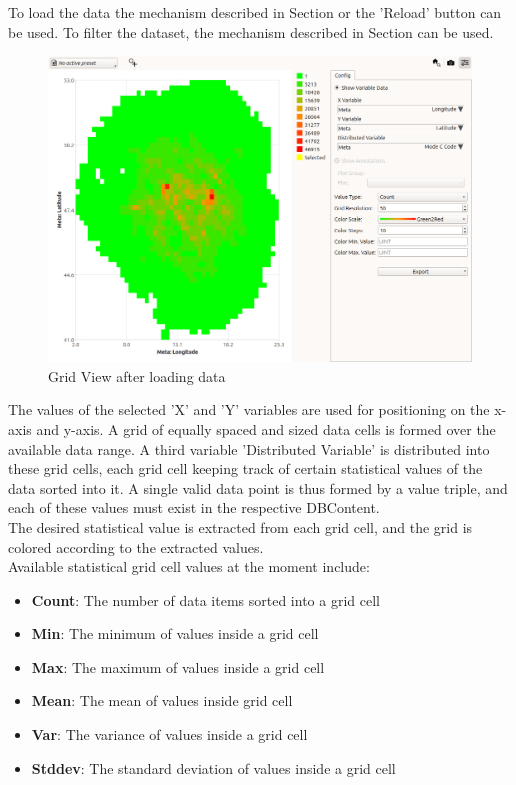 To load the data the mechanism described in Section  or the 'Reload' button can be used. To filter the dataset, the mechanism described in Section  can be used. \\

\begin{figure}[H]
    \hspace*{-2cm}
    \includegraphics[width=18cm,frame]{figures/grid_loaded.png}
  \caption{Grid View after loading data}
\end{figure}

The values of the selected 'X' and 'Y' variables are used for positioning on the x-axis and y-axis.
A grid of equally spaced and sized data cells is formed over the available data range.
A third variable 'Distributed Variable' is distributed into these grid cells, each grid cell
keeping track of certain statistical values of the data sorted into it.
A single valid data point is thus formed by a value triple, and each of these values must exist in the respective DBContent. \\

The desired statistical value is extracted from each grid cell, and the grid is colored according to the extracted values. \\

Available statistical grid cell values at the moment include:

\begin{itemize}
    \item \textbf{Count}: The number of data items sorted into a grid cell
    \item \textbf{Min}: The minimum of values inside a grid cell
    \item \textbf{Max}: The maximum of values inside a grid cell
    \item \textbf{Mean}: The mean of values inside grid cell
    \item \textbf{Var}: The variance of values inside a grid cell
    \item \textbf{Stddev}: The standard deviation of values inside a grid cell
\end{itemize}
\ \\

